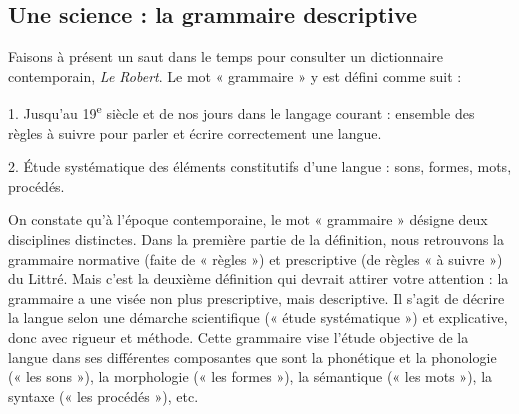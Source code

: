 \subsection{Une science : la grammaire descriptive}
Faisons à présent un saut dans le temps pour consulter un dictionnaire contemporain, \textit{Le Robert}. Le mot « grammaire » y est défini comme suit :
\begin{lecture}{}
1. Jusqu’au 19\textsuperscript{e} siècle et de nos jours dans le langage courant : ensemble des règles à suivre pour parler et écrire correctement une langue.

2. Étude systématique des éléments constitutifs d’une langue : sons, formes, mots, procédés.
\end{lecture}
On constate qu’à l’époque contemporaine, le mot « grammaire » désigne deux disciplines distinctes. Dans la première partie de la définition, nous retrouvons la grammaire normative (faite de « règles ») et prescriptive (de règles « à suivre ») du Littré. Mais c’est la deuxième définition qui devrait attirer votre attention : la grammaire a une visée non plus prescriptive, mais descriptive. Il s’agit de décrire la langue selon une démarche scientifique (« étude systématique ») et explicative, donc avec rigueur et méthode. Cette grammaire vise l’étude objective de la langue dans ses différentes composantes que sont la phonétique et la phonologie (« les sons »), la morphologie (« les formes »), la sémantique (« les mots »), la syntaxe (« les procédés »), etc.
